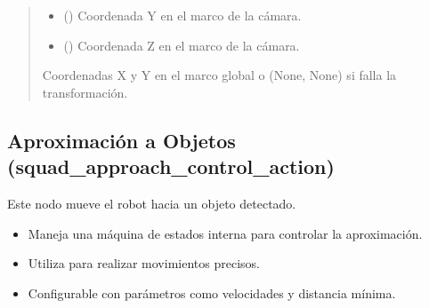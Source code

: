 \documentclass[a4paper,10pt,spanish]{sphinxmanual}
\begin{document}
\begin{fulllineitems}
\begin{fulllineitems}
\begin{quote}
\begin{description}
\begin{itemize}
\item {} 
\sphinxAtStartPar
{} () \textendash{} Coordenada Y en el marco de la cámara.

\item {} 
\sphinxAtStartPar
{} () \textendash{} Coordenada Z en el marco de la cámara.

\end{itemize}

\sphinxAtStartPar
Coordenadas X y Y en el marco global o (None, None) si falla la transformación.

\sphinxAtStartPar
{}

\end{description}\end{quote}

\end{fulllineitems}


\end{fulllineitems}


\sphinxstepscope


\subsection{Aproximación a Objetos (squad\_approach\_control\_action)}
\label{\detokenize{squad_approach_control_action:aproximacion-a-objetos-squad-approach-control-action}}\label{\detokenize{squad_approach_control_action::doc}}
\sphinxAtStartPar
Este nodo mueve el robot hacia un objeto detectado.

\sphinxAtStartPar
{}
\begin{itemize}
\item {} 
\sphinxAtStartPar
Maneja una máquina de estados interna para controlar la aproximación.

\item {} 
\sphinxAtStartPar
Utiliza  para realizar movimientos precisos.

\item {} 
\sphinxAtStartPar
Configurable con parámetros como velocidades y distancia mínima.

\end{itemize}
\end{document}
